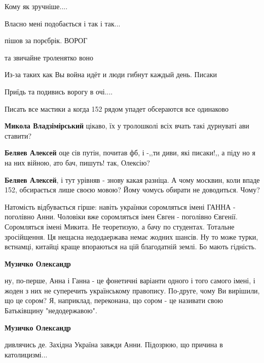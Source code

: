 \begin{itemize}
Кому як зручніше....

Власно мені подобається і так і так...

\begin{itemize} %
пішов за порєбрік. ВОРОГ

та звичайне троленятко воно

Из-за таких как Вы война идёт и люди гибнут каждый день. Писаки

Приїдь та подивись ворогу в очі....

Писать все мастики а когда 152 рядом упадет обсераются все одинаково

\textbf{Микола Владзімірський} цікаво, їх у тролошколі всіх вчать такі дурнуваті ави ставити?

\textbf{Беляев Алексей} оце сів путін, почитав фб, і -,,ти диви, які писаки!,, а піду но я на них війною, ато бач, пишуть! так, Олексію?

\textbf{Беляев Алексей}, і тут урівняв - знову какая разніца. А чому москвин, коли впаде 152, обсирається лише своєю мовою? Йому чомусь обирати не доводиться. Чому?
\end{itemize} %


Натомість відбувається гірше: навіть українки соромляться імені ГАННА -
поголівно Анни. Чоловіки вже соромляться імен Євген - поголівно Євгенії.
Соромляться імені Микита. Не теоретизую, а бачу по студентах. Тотальне
зросійщення. Ця нещасна недодаержава немає жодних шансів. Ну то може турки,
вєтнамці, китайці краще впораються на цій благодатній землі. Бо мають гідність.

\begin{itemize} %
\textbf{Музичко Олександр} 

ну, по-перше, Анна і Ганна - це фонетичні варіанти одного і того самого імені,
і жоден з них не суперечить українському правопису. По-друге, чому Ви вирішили,
що це сором? Я, наприклад, переконана, що сором - це називати свою Батьківщину
"недодержавою".

\textbf{Музичко Олександр} 

дивлячись де. Західна Україна завжди Анни. Підозрюю, що причина в
католицизмі...



\end{itemize}
\end{itemize}
